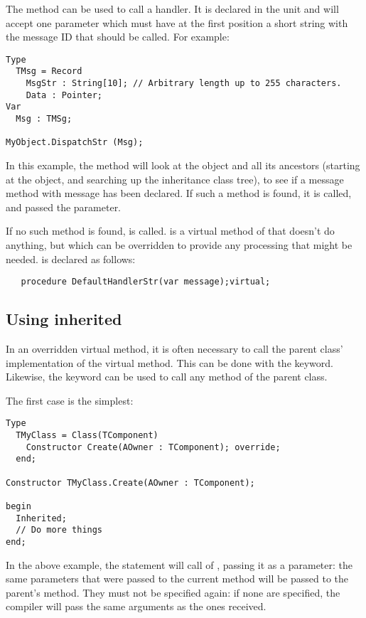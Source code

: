 The   method can be used to call a 
handler. It is declared in the  unit and will accept one parameter
which must have at the first position a short string with the message ID that
should be called. For example:
\begin{verbatim}
Type
  TMsg = Record
    MsgStr : String[10]; // Arbitrary length up to 255 characters.
    Data : Pointer;
Var
  Msg : TMSg;

MyObject.DispatchStr (Msg);
\end{verbatim}
In this example, the  method will look at the object and
all its ancestors (starting at the object, and searching up the inheritance 
class tree), to see if a message method with message  has been
declared. If such a method is found, it is called, and passed the
 parameter.

If no such method is found,  is called.
 is a virtual method of  that doesn't do
anything, but which can be overridden to provide any processing that might be
needed.  is declared as follows:
\begin{verbatim}
   procedure DefaultHandlerStr(var message);virtual;
\end{verbatim}

\subsection{Using inherited}
In an overridden virtual method, it is often necessary to call the parent
class' implementation of the virtual method. This can be  done with the
 keyword. Likewise, the  keyword can be used
to call any method of the parent class.

The first case is the simplest:
\begin{verbatim}
Type
  TMyClass = Class(TComponent)
    Constructor Create(AOwner : TComponent); override;
  end;

Constructor TMyClass.Create(AOwner : TComponent); 

begin
  Inherited;
  // Do more things
end;
\end{verbatim}
In the above example, the  statement will call 
of , passing it  as a parameter: the same
parameters that were passed to the current method will be passed to the
parent's method. They must not be specified again: if none are specified,
the compiler will pass the same arguments as the ones received.

